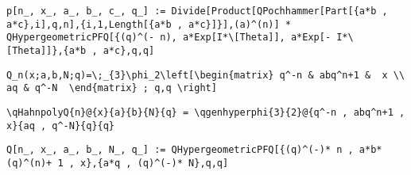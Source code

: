 \newsavebox\CYMM
\begin{lrbox}{\CYMM}
 \begin{minipage}[t]{0.82\textwidth}
  \lstinline[language={[latex]TeX},mathescape,breaklines=true]"p[n_, x_, a_, b_, c_, q_] := Divide[Product[QPochhammer[Part[{a*b , a*c},i],q,n],{i,1,Length[{a*b , a*c}]}],(a)^(n)] * QHypergeometricPFQ[{(q)^(- n), a*Exp[I*\[Theta]], a*Exp[- I*\[Theta]]},{a*b , a*c},q,q]"
 \end{minipage}
\end{lrbox}
\newsavebox\CYMA
\begin{lrbox}{\CYMA}
 \begin{minipage}[t]{0.82\textwidth}
  \lstinline[language={[latex]TeX},mathescape,breaklines=true]""
 \end{minipage}
\end{lrbox}
\newsavebox\CZT
\begin{lrbox}{\CZT}
 \begin{minipage}[t]{0.82\textwidth}
  \lstinline[language={[latex]TeX},mathescape,breaklines=true]"Q_n(x;a,b,N;q)=\;_{3}\phi_2\left[\begin{matrix} q^-n & abq^n+1 &  x \\ aq & q^-N  \end{matrix} ; q,q \right]"
 \end{minipage}
\end{lrbox}
\newsavebox\CZST
\begin{lrbox}{\CZST}
 \begin{minipage}[t]{0.82\textwidth}
  \lstinline[language={[latex]TeX},mathescape,breaklines=true]"\qHahnpolyQ{n}@{x}{a}{b}{N}{q} = \qgenhyperphi{3}{2}@{q^-n , abq^n+1 , x}{aq , q^-N}{q}{q}"
 \end{minipage}
\end{lrbox}
\newsavebox\CZMM
\begin{lrbox}{\CZMM}
 \begin{minipage}[t]{0.82\textwidth}
  \lstinline[language={[latex]TeX},mathescape,breaklines=true]"Q[n_, x_, a_, b_, N_, q_] := QHypergeometricPFQ[{(q)^(-)* n , a*b*(q)^(n)+ 1 , x},{a*q , (q)^(-)* N},q,q]"
 \end{minipage}
\end{lrbox}
\newsavebox\CZMA
\begin{lrbox}{\CZMA}
 \begin{minipage}[t]{0.82\textwidth}
  \lstinline[language={[latex]TeX},mathescape,breaklines=true]""
 \end{minipage}
\end{lrbox}
